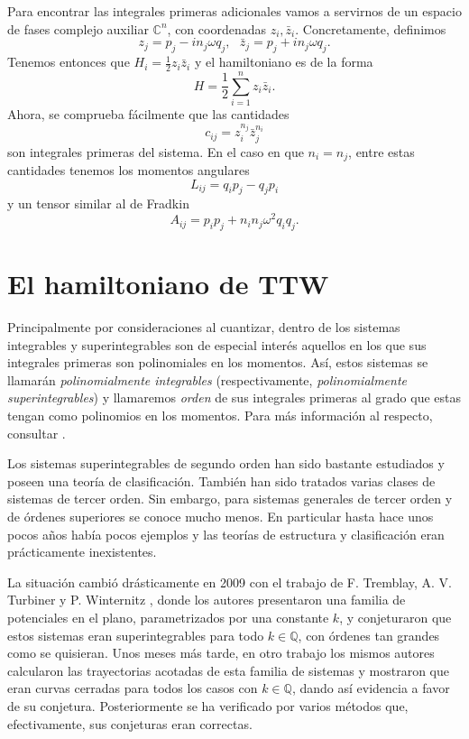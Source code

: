 \documentclass[12pt,a4paper,twoside]{article}
\theoremstyle{definition} \newtheorem{defn}[thm]{Definición}
\theoremstyle{definition} \newtheorem{ejemplo}[thm]{Ejemplo}
\theoremstyle{definition} \newtheorem{ejercicio}[thm]{Ejercicio}
\theoremstyle{remark} \newtheorem*{obs}{Observación}
\def\CC{\mathbb{C}}
\def\QQ{\mathbb{Q}}
\begin{document}
Para encontrar las integrales primeras adicionales vamos a servirnos de un espacio de fases complejo auxiliar $\CC^n$, con coordenadas $z_i, \bar{z}_i$. Concretamente, definimos
\begin{equation}
  z_j=p_j-in_j\omega q_j,\ \ \  \bar{z}_j=p_j+in_j\omega q_j.  
\end{equation}
Tenemos entonces que $H_i=\frac{1}{2}z_i\bar{z}_i$ y el hamiltoniano es de la forma
\begin{equation}
  H=\frac{1}{2}\sum_{i=1}^n z_i\bar{z}_i. 
\end{equation}
Ahora, se comprueba fácilmente que las cantidades
\begin{equation}
  c_{ij}=z_i^{n_j}\bar{z}_j^{n_i} 
\end{equation}
son integrales primeras del sistema. En el caso en que $n_i=n_j$, entre estas cantidades tenemos los momentos angulares
\begin{equation}
  L_{ij}=q_ip_j-q_jp_i 
\end{equation}
y un tensor similar al de Fradkin
\begin{equation}
  A_{ij}=p_ip_j+n_in_j\omega^2 q_iq_j. 
\end{equation}

\section{El hamiltoniano de TTW}
Principalmente por consideraciones al cuantizar, dentro de los sistemas integrables y superintegrables son de especial interés aquellos en los que sus integrales primeras son polinomiales en los momentos. Así, estos sistemas se llamarán \emph{polinomialmente integrables} (respectivamente, \emph{polinomialmente superintegrables}) y llamaremos \emph{orden} de sus integrales primeras al grado que estas tengan como polinomios en los momentos. Para más información al respecto, consultar \cite{miller}.

Los sistemas superintegrables de segundo orden han sido bastante estudiados y poseen una teoría de clasificación. También han sido tratados varias clases de sistemas de tercer orden. Sin embargo, para sistemas generales de tercer orden y de órdenes superiores se conoce mucho menos. En particular hasta hace unos pocos años había pocos ejemplos y las teorías de estructura y clasificación eran prácticamente inexistentes. 

La situación cambió drásticamente en 2009 con el trabajo de F. Tremblay, A. V. Turbiner y P. Winternitz \cite{ttw1}, donde los autores presentaron una familia de potenciales en el plano, parametrizados por una constante $k$, y conjeturaron que estos sistemas eran superintegrables para todo $k\in \QQ$, con órdenes tan grandes como se quisieran. Unos meses más tarde, en otro trabajo \cite{ttw2} los mismos autores calcularon las trayectorias acotadas de esta familia de sistemas y mostraron que eran curvas cerradas para todos los casos con $k \in \QQ$, dando así evidencia a favor de su conjetura. Posteriormente se ha verificado por varios métodos que, efectivamente, sus conjeturas eran correctas.
\end{document}

